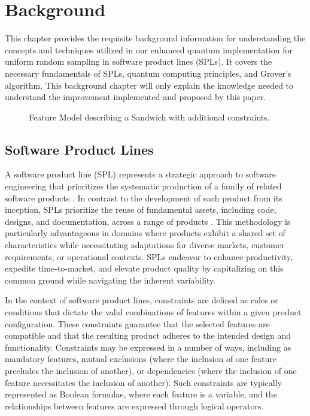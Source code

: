 \section{Background}
This chapter provides the requisite background information for understanding the concepts and techniques utilized in our enhanced quantum implementation for uniform random sampling in software product lines (SPLs).
It covers the necessary fundamentals of SPLs, quantum computing principles, and Grover's algorithm. 
This background chapter will only explain the knowledge needed to understand the improvement implemented and proposed by this paper.

\begin{figure*}
    \centering
    
    \caption{Feature Model describing a Sandwich with additional constraints.}
    \label{fig:bg:spl:sandwich-imply-model}
\end{figure*}

\subsection{Software Product Lines}
A software product line (SPL) represents a strategic approach to software engineering that prioritizes the systematic production of a family of related software products \cite{spl-pohl, KCHNP:TR90}.
In contrast to the development of each product from its inception, SPLs prioritize the reuse of fundamental assets, including code, designs, and documentation, across a range of products \cite{ClementsSoftwareProduct2001}.
This methodology is particularly advantageous in domains where products exhibit a shared set of characteristics while necessitating adaptations for diverse markets, customer requirements, or operational contexts.
SPLs endeavor to enhance productivity, expedite time-to-market, and elevate product quality by capitalizing on this common ground while navigating the inherent variability.

In the context of software product lines, constraints are defined as rules or conditions that dictate the valid combinations of features within a given product configuration. 
These constraints guarantee that the selected features are compatible and that the resulting product adheres to the intended design and functionality. 
Constraints may be expressed in a number of ways, including as mandatory features, mutual exclusions (where the inclusion of one feature precludes the inclusion of another), or dependencies (where the inclusion of one feature necessitates the inclusion of another). 
Such constraints are typically represented as Boolean formulae, where each feature is a variable, and the relationships between features are expressed through logical operators. 

